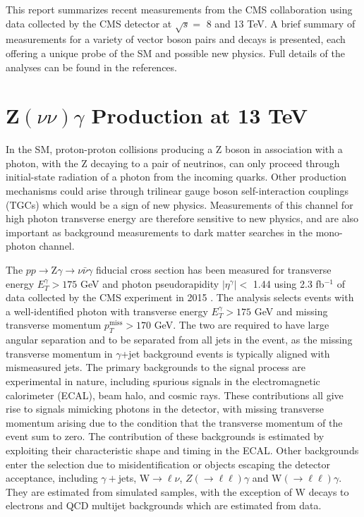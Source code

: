 \documentclass[10pt]{article}
\begin{document}
This report summarizes recent measurements from the CMS collaboration using
data collected by the CMS detector at $\sqrt{s} =$ 8 and 13 TeV. A brief summary
of measurements for a variety of vector boson pairs and decays is presented, 
each offering a unique probe of the SM and possible new physics. Full details of 
the analyses can be found in the references.

\section{Z$(\nu\nu)\gamma$ Production at 13 TeV}
In the SM, proton-proton collisions producing a Z boson in association with a photon,
with the Z decaying to a pair of neutrinos, can only proceed through
initial-state radiation of a photon from the incoming quarks.
Other production mechanisms could arise through trilinear gauge boson 
self-interaction couplings (TGCs) which would be a sign of new physics. 
Measurements of this channel for high photon transverse energy are therefore
sensitive to new physics, and are also important as background measurements to
dark matter searches in the mono-photon channel.

The $pp \rightarrow \mathrm{Z}\gamma \rightarrow \nu\bar{\nu}\gamma$ fiducial cross section 
has been measured for transverse energy $E_{T}^{\gamma} > 175$ GeV and photon pseudorapidity
$\lvert\eta^{\gamma}\rvert < $ 1.44 using 2.3 fb$^{-1}$ of data collected by the CMS experiment in 2015
\cite{CMS-PAS-SMP-16-004}.
The analysis selects events with a well-identified photon with transverse energy $E_{T}^{\gamma} > 175$ GeV
and missing transverse momentum $p_{T}^{\mathrm{miss}} > 170$ GeV. 
The two are required to
have large angular separation and to be separated from all jets in the event, as
the missing transverse momentum in $\gamma$+jet background events is typically aligned 
with mismeasured jets.
The primary backgrounds to the signal process are experimental in nature, including 
spurious signals in the electromagnetic calorimeter (ECAL), beam halo, and cosmic rays. 
These contributions all give rise to signals mimicking photons in the detector, 
with missing transverse momentum arising due to the 
condition that the transverse momentum of the event sum to zero. The contribution of
these backgrounds is estimated
by exploiting their characteristic shape and timing in the ECAL. Other backgrounds 
enter the selection due to misidentification or objects escaping the detector acceptance,
including $\gamma+$jets, W$\rightarrow \ell\nu$, $Z(\rightarrow\ell\ell)\gamma$ and 
W$(\rightarrow\ell\ell)\gamma$. They are estimated from simulated samples, with the exception
of W decays to electrons and QCD multijet backgrounds which are estimated from data.
\end{document}
